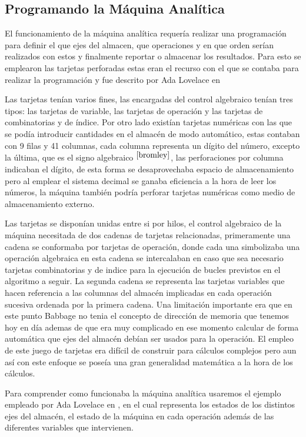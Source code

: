 \documentclass[runningheads,a4paper]{llncs}
\begin{document}
\subsection*{Programando la Máquina Analítica}

El funcionamiento de la máquina analítica requería realizar una programación para definir el que ejes del almacen, que operaciones y en que orden serían realizados con estos y finalmente reportar o almacenar los resultados. Para esto se
emplearon las tarjetas perforadas estas eran el recurso con el que se contaba para realizar la programación y fue descrito por Ada Lovelace en \cite{lovelace}

Las tarjetas tenían varios fines, las encargadas del control algebraico tenían tres tipos: las tarjetas de variable, las tarjetas de operación y las tarjetas de combinatorias y de índice. Por otro lado existían tarjetas numéricas con las que se podía introducir cantidades en el almacén de modo automático, estas contaban con 9 filas y 41 columnas, cada columna representa un dígito del número, excepto la última, que es el signo algebraico $^{\cite{bromley}}$, las perforaciones por columna indicaban el dígito, de esta forma se desaprovechaba espacio de almacenamiento pero al emplear el sistema decimal se ganaba eficiencia a la hora de leer los números, la máquina también podría perforar tarjetas numéricas como medio de almacenamiento externo.

Las tarjetas se disponían unidas entre si por hilos, el control algebraico de la máquina necesitada de dos cadenas de
tarjetas relacionadas, primeramente una cadena se conformaba por tarjetas de operación, donde cada una simbolizaba una
operación algebraica en esta cadena se intercalaban en caso que sea necesario tarjetas combinatorias y de indice para 
la ejecución de bucles previstos en el algoritmo a seguir. La segunda cadena se representa las tarjetas variables que hacen referencia a las columnas del almacén implicadas en cada operación sucesiva ordenada por la primera cadena. Una
limitación importante era que en este punto Babbage no tenia el concepto de dirección de memoria que tenemos hoy en día
ademas de que era muy complicado en ese momento calcular de forma automática que ejes del almacén debían ser usados 
para la operación. El empleo de este juego de tarjetas era difícil de construir para cálculos complejos pero aun así
con este enfoque se poseía una gran generalidad matemática a la hora de los cálculos.

Para comprender como funcionaba la máquina analítica usaremos el ejemplo empleado por Ada Lovelace en \cite{lovelace}, en el cual representa los estados de los distintos ejes del almacén, el estado de la máquina en cada operación además de las diferentes variables que intervienen.
\end{document}
